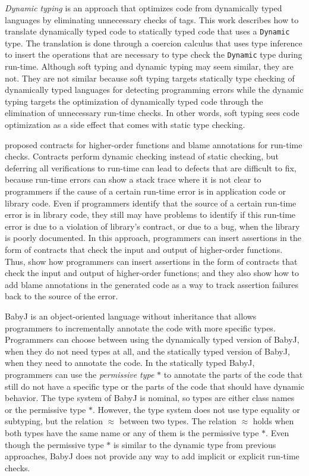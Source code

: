\documentclass[preprint]{sig-alternate}
\begin{document}
\textit{Dynamic typing} \cite{henglein1994dts} is an approach
that optimizes code from dynamically typed languages by eliminating
unnecessary checks of tags.
This work describes how to translate dynamically typed code to
statically typed code that uses a \verb'Dynamic' type.
The translation is done through a coercion calculus that uses type
inference to insert the operations that are necessary to type check
the \verb'Dynamic' type during run-time.
Although soft typing and dynamic typing may seem similar, they are not.
They are not similar because soft typing targets statically type
checking of dynamically typed languages for detecting programming
errors while the dynamic typing targets the optimization of dynamically
typed code through the elimination of unnecessary run-time checks.
In other words, soft typing sees code optimization as a side effect
that comes with static type checking.

\cite{findler2002chf} proposed contracts for higher-order functions
and blame annotations for run-time checks.
Contracts perform dynamic checking instead of static checking,
but deferring all verifications to run-time can lead to defects
that are difficult to fix, because run-time errors can show a
stack trace where it is not clear to programmers if the cause of a
certain run-time error is in application code or library code.
Even if programmers identify that the source of a certain run-time
error is in library code, they still may have problems to identify
if this run-time error is due to a violation of library's contract,
or due to a bug, when the library is poorly documented.
In this approach, programmers can insert assertions in the form of
contracts that check the input and output of higher-order functions.
Thus, \cite{findler2002chf} show how programmers can insert
assertions in the form of contracts that check the input and output
of higher-order functions; and they also show how to add blame
annotations in the generated code as a way to track assertion
failures back to the source of the error.

BabyJ \cite{anderson2002babyj} is an object-oriented language
without inheritance that allows programmers to incrementally annotate
the code with more specific types.
Programmers can choose between using the dynamically typed version
of BabyJ, when they do not need types at all, and the statically
typed version of BabyJ, when they need to annotate the code.
In the statically typed BabyJ, programmers can use the
\textit{permissive type} $*$ to annotate the parts of the code that
still do not have a specific type or the parts of the code that should
have dynamic behavior.
The type system of BabyJ is nominal, so types are either class names
or the permissive type $*$.
However, the type system does not use type equality or subtyping,
but the relation $\approx$ between two types.
The relation $\approx$ holds when both types have the same name or
any of them is the permissive type $*$.
Even though the permissive type $*$ is similar to the dynamic type
from previous approaches, BabyJ does not provide any way to add
implicit or explicit run-time checks.
\end{document}
